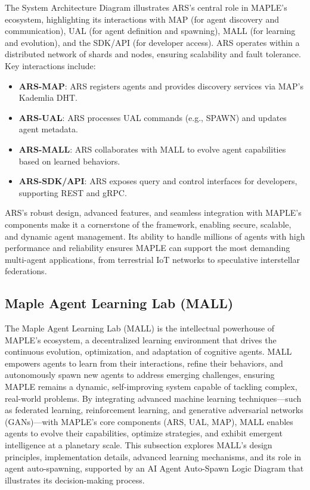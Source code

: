 \documentclass[a4paper,11pt]{article}
\begin{document}
The System Architecture Diagram illustrates ARS’s central role in MAPLE’s ecosystem, highlighting its interactions with MAP (for agent discovery and communication), UAL (for agent definition and spawning), MALL (for learning and evolution), and the SDK/API (for developer access). ARS operates within a distributed network of shards and nodes, ensuring scalability and fault tolerance. Key interactions include:
\begin{itemize}[leftmargin=*]
    \item \textbf{ARS-MAP}: ARS registers agents and provides discovery services via MAP’s Kademlia DHT.
    \item \textbf{ARS-UAL}: ARS processes UAL commands (e.g., SPAWN) and updates agent metadata.
    \item \textbf{ARS-MALL}: ARS collaborates with MALL to evolve agent capabilities based on learned behaviors.
    \item \textbf{ARS-SDK/API}: ARS exposes query and control interfaces for developers, supporting REST and gRPC.
\end{itemize}

ARS’s robust design, advanced features, and seamless integration with MAPLE’s components make it a cornerstone of the framework, enabling secure, scalable, and dynamic agent management. Its ability to handle millions of agents with high performance and reliability ensures MAPLE can support the most demanding multi-agent applications, from terrestrial IoT networks to speculative interstellar federations.

\pagebreak

\subsection{Maple Agent Learning Lab (MALL)}
The Maple Agent Learning Lab (MALL) is the intellectual powerhouse of MAPLE’s ecosystem, a decentralized learning environment that drives the continuous evolution, optimization, and adaptation of cognitive agents. MALL empowers agents to learn from their interactions, refine their behaviors, and autonomously spawn new agents to address emerging challenges, ensuring MAPLE remains a dynamic, self-improving system capable of tackling complex, real-world problems. By integrating advanced machine learning techniques—such as federated learning, reinforcement learning, and generative adversarial networks (GANs)—with MAPLE’s core components (ARS, UAL, MAP), MALL enables agents to evolve their capabilities, optimize strategies, and exhibit emergent intelligence at a planetary scale. This subsection explores MALL’s design principles, implementation details, advanced learning mechanisms, and its role in agent auto-spawning, supported by an AI Agent Auto-Spawn Logic Diagram that illustrates its decision-making process.
\end{document}
